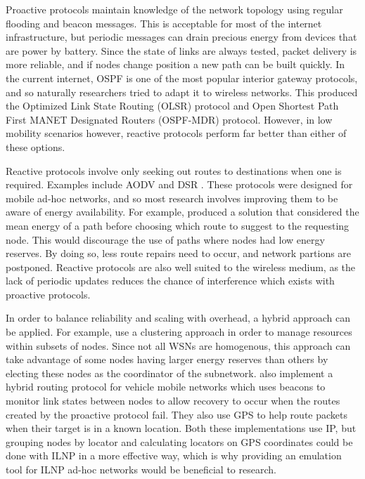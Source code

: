 \documentclass[12pt]{article}
\begin{document}
Proactive protocols maintain knowledge of the network topology using regular flooding and beacon messages. This is acceptable for most of the internet infrastructure, but periodic messages can drain precious energy from devices that are power by battery. Since the state of links are always tested, packet delivery is more reliable, and if nodes change position a new path can be built quickly. In the current internet, OSPF is one of the most popular interior gateway protocols, and so naturally researchers tried to adapt it to wireless networks. This produced the Optimized Link State Routing (OLSR) protocol \cite{olsr} and Open Shortest Path First MANET Designated Routers (OSPF-MDR) protocol. However, in low mobility scenarios however, reactive protocols perform far better than either of these options. 

Reactive protocols involve only seeking out routes to destinations when one is required. Examples include AODV \cite{aodv} and DSR \cite{dsr}. These protocols were designed for mobile ad-hoc networks, and so most research involves improving them to be aware of energy availability. For example, \cite{eaodv} produced a solution that considered the mean energy of a path before choosing which route to suggest to the requesting node. This would discourage the use of paths where nodes had low energy reserves. By doing so, less route repairs need to occur, and network partions are postponed. Reactive protocols are also well suited to the wireless medium, as the lack of periodic updates reduces the chance of interference which exists with proactive protocols.

In order to balance reliability and scaling with overhead, a hybrid approach can be applied. For example, \cite{cluster} use a clustering approach in order to manage resources within subsets of nodes. Since not all WSNs are homogenous, this approach can take advantage of some nodes having larger energy reserves than others by electing these nodes as the coordinator of the subnetwork. \cite{vanet} also implement a hybrid routing protocol for vehicle mobile networks which uses beacons to monitor link states between nodes to allow recovery to occur when the routes created by the proactive protocol fail. They also use GPS to help route packets when their target is in a known location. Both these implementations use IP, but grouping nodes by locator and calculating locators on GPS coordinates could be done with ILNP in a more effective way, which is why providing an emulation tool for ILNP ad-hoc networks would be beneficial to research.
\end{document}
